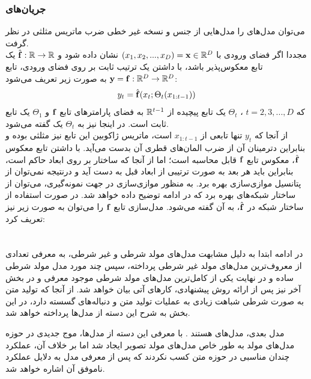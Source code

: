 \subsubsection{جریان‌های \autoregressive{}}
می‌توان مدل‌های \autoregressive{} را مدل‌هایی از جنس \normalizingflownets{} و نسخه غیر خطی ضرب ماتریس مثلثی در نظر گرفت.
\\
مجددا اگر فضای ورودی با
$(x_1, x_2, ..., x_D) = {\bf x} \in {\mathbb{R}}^D$
 نشان داده شود و
$\hat{{\bf f}} : {\mathbb{R}} \rightarrow {\mathbb{R}}$
یک تابع معکوس‌پذیر باشد، با داشتن یک ترتیب ثابت بر روی فضای ورودی، تابع \autoregressive{}
${\bf y} = {\bf f} : {\mathbb{R}}^D \rightarrow {\mathbb{R}}^D$
به صورت زیر تعریف می‌شود:
\begin{align}
y_t = \hat{{\bf f}}(x_t; \Theta_t(x_{1:t-1}))
\end{align}
که $t= 2, 3, ..., D$
، $\Theta_t$
  یک تابع پیچیده از ${\mathbb{R}}^{t-1}$ به فضای پارامترهای تابع ${\bf f}$ و $\Theta_1$ یک تابع ثابت است. در اینجا نیز به $\Theta_t$ یک \conditioner{} گفته می‌شود.
  \\
 از آنجا که $y_t$ تنها تابعی از $x_{1:t-1}$ است، ماتریس ژاکوبین این تابع نیز مثلثی بوده و بنابراین دترمینان آن از ضرب المان‌های قطری آن بدست می‌آید. با داشتن تابع معکوس $\hat{{\bf f}}$، معکوس تابع ${\bf f}$ قابل محاسبه است؛ اما از آنجا که ساختار \autoregressive{} بر روی ابعاد حاکم است، بنابراین  باید هر بعد به صورت ترتیبی از ابعاد قبل به دست آید و درنتیجه نمی‌توان از پتانسیل موازی‌سازی 
 بهره برد. به منظور موازی‌سازی در جهت نمونه‌گیری، می‌توان از ساختار شبکه‌های  بهره برد که در ادامه توضیح داده خواهد شد.
 در صورت استفاده از ساختار شبکه  در $\hat{{\bf f}}$، به آن  گفته می‌شود.
مدل‌سازی تابع \autoregressive{} 
${\bf f}$
را می‌توان به صورت زیر نیز تعریف کرد:



\section{\condtg}
در ادامه ابتدا به دلیل مشابهت مدل‌های مولد شرطی و غیر شرطی، به معرفی تعدادی از معروف‌ترین مدل‌های مولد غیر شرطی پرداخته، سپس چند مورد مدل مولد شرطی ساده و در نهایت یکی از کامل‌ترین مدل‌های مولد شرطی موجود معرفی و در بخش آخر نیز پس از ارائه روش پیشنهادی، کارهای آتی بیان خواهد شد.
از آنجا که تولید متن به صورت شرطی شباهت زیادی به عملیات تولید متن و دنباله‌های گسسته دارد، در این بخش به شرح این دسته از مدل‌ها پرداخته خواهد شد.

مدل بعدی، مدل‌های
هستند \cite{vae-org}. با معرفی این دسته از مدل‌ها، موج جدیدی در حوزه مدل‌های مولد به طور خاص مدل‌های مولد تصویر ایجاد شد اما بر خلاف آن، عملکرد چندان مناسبی در حوزه متن کسب نکردند \cite{vae-text} که پس از معرفی مدل به دلایل عملکرد ناموفق آن اشاره خواهد شد.\\
